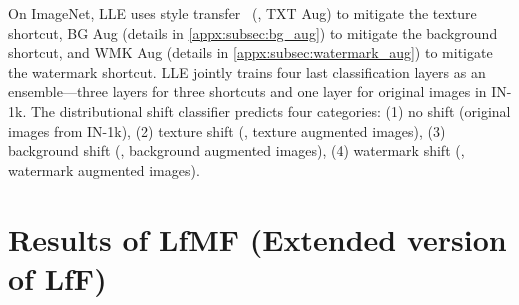 \documentclass[10pt,twocolumn,letterpaper]{article}
\begin{document}
On ImageNet, LLE uses style transfer~\cite{geirhos2019Int.Conf.Learn.Represent.ImageNettrained} (\ie, TXT Aug) to mitigate the texture shortcut, BG Aug (details in \cref{appx:subsec:bg_aug}) to mitigate the background shortcut, and WMK Aug (details in \cref{appx:subsec:watermark_aug}) to mitigate the watermark shortcut. LLE jointly trains four last classification layers as an ensemble---three layers for three shortcuts and one layer for original images in IN-1k. The distributional shift classifier predicts four categories: (1) no shift (original images from IN-1k), (2) texture shift (\ie, texture augmented images), (3) background shift (\ie, background augmented images), (4) watermark shift (\ie, watermark augmented images).

\section{Results of LfMF (Extended version of LfF)}
\end{document}
